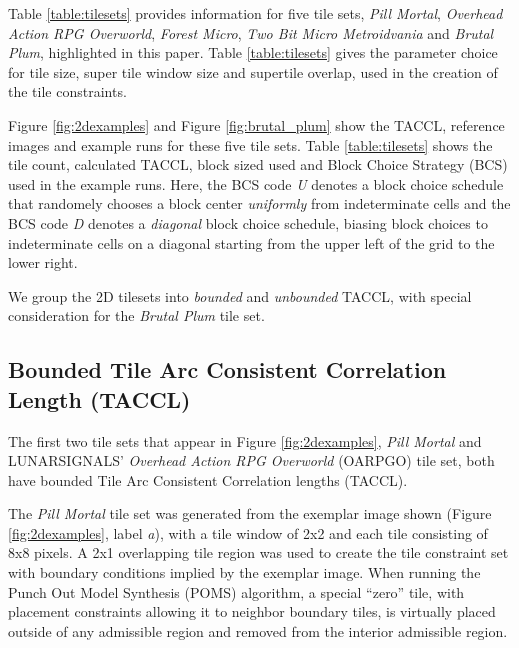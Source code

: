 Table \ref{table:tilesets} provides information for five tile sets, \textit{Pill Mortal}, \textit{Overhead Action RPG Overworld},
\textit{Forest Micro}, \textit{Two Bit Micro Metroidvania} and \textit{Brutal Plum}, highlighted in this paper.
Table \ref{table:tilesets} gives the parameter choice for tile size, super tile window size and supertile overlap, used in
  the creation of the tile constraints.

Figure \ref{fig:2dexamples} and Figure \ref{fig:brutal_plum} show the TACCL, reference images and example runs
for these five tile sets.
Table \ref{table:tilesets} shows the tile count, calculated TACCL, block sized used and Block Choice Strategy (BCS)
used in the example runs.
Here, the BCS code \textit{U} denotes a block choice schedule that randomely chooses a block center \textit{uniformly} from
indeterminate cells and the BCS code \textit{D} denotes a \textit{diagonal} block choice schedule, biasing block choices
to indeterminate cells on a diagonal starting from the upper left of the grid to the lower right.

We group the 2D tilesets into \textit{bounded} and \textit{unbounded} TACCL, with special consideration for
the \textit{Brutal Plum} tile set.




\subsection{Bounded Tile Arc Consistent Correlation Length (TACCL)}

The first two tile sets that appear in Figure \ref{fig:2dexamples}, \textit{Pill Mortal} and LUNARSIGNALS' \textit{Overhead Action RPG Overworld}
(OARPGO) tile set, both
have bounded Tile Arc Consistent Correlation lengths (TACCL).

The \textit{Pill Mortal} tile set was generated from the exemplar image shown (Figure \ref{fig:2dexamples}, label \textit{a}), with a tile window of 2x2
and each tile consisting of 8x8 pixels.
A 2x1 overlapping tile region was used to create the tile constraint set with boundary conditions implied by the exemplar image.
When running the Punch Out Model Synthesis (POMS) algorithm, a special ``zero'' tile,
  with placement constraints allowing it to neighbor boundary tiles,
is virtually placed outside of any admissible region and removed from the interior admissible region.

